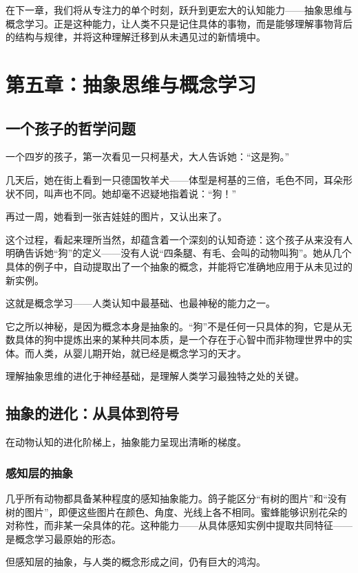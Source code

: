 \documentclass[11pt]{article}
\begin{document}
在下一章，我们将从专注力的单个时刻，跃升到更宏大的认知能力——抽象思维与概念学习。正是这种能力，让人类不只是记住具体的事物，而是能够理解事物背后的结构与规律，并将这种理解迁移到从未遇见过的新情境中。
\section{第五章：抽象思维与概念学习}
\label{sec:orgec5300b}

\subsection{一个孩子的哲学问题}
\label{sec:org395c310}

一个四岁的孩子，第一次看见一只柯基犬，大人告诉她：“这是狗。”

几天后，她在街上看到一只德国牧羊犬——体型是柯基的三倍，毛色不同，耳朵形状不同，叫声也不同。她却毫不迟疑地指着说：“狗！”

再过一周，她看到一张吉娃娃的图片，又认出来了。

这个过程，看起来理所当然，却蕴含着一个深刻的认知奇迹：这个孩子从来没有人明确告诉她“狗”的定义——没有人说“四条腿、有毛、会叫的动物叫狗”。她从几个具体的例子中，自动提取出了一个抽象的概念，并能将它准确地应用于从未见过的新实例。

这就是概念学习——人类认知中最基础、也最神秘的能力之一。

它之所以神秘，是因为概念本身是抽象的。“狗”不是任何一只具体的狗，它是从无数具体的狗中提炼出来的某种共同本质，是一个存在于心智中而非物理世界中的实体。而人类，从婴儿期开始，就已经是概念学习的天才。

理解抽象思维的进化于神经基础，是理解人类学习最独特之处的关键。
\subsection{抽象的进化：从具体到符号}
\label{sec:org6f65543}

在动物认知的进化阶梯上，抽象能力呈现出清晰的梯度。
\subsubsection{感知层的抽象}
\label{sec:org715459c}

几乎所有动物都具备某种程度的感知抽象能力。鸽子能区分“有树的图片”和“没有树的图片”，即便这些图片在颜色、角度、光线上各不相同。蜜蜂能够识别花朵的对称性，而非某一朵具体的花。这种能力——从具体感知实例中提取共同特征——是概念学习最原始的形态。

但感知层的抽象，与人类的概念形成之间，仍有巨大的鸿沟。
\end{document}
